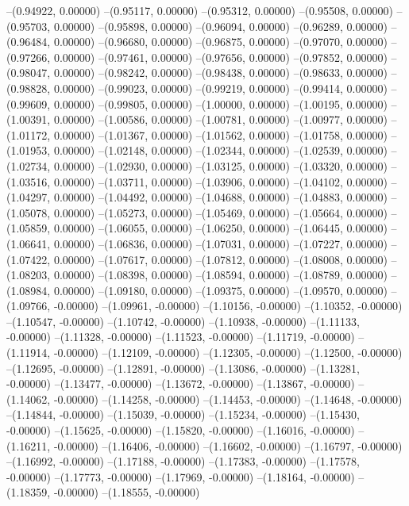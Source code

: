 --(0.94922, 0.00000)
--(0.95117, 0.00000)
--(0.95312, 0.00000)
--(0.95508, 0.00000)
--(0.95703, 0.00000)
--(0.95898, 0.00000)
--(0.96094, 0.00000)
--(0.96289, 0.00000)
--(0.96484, 0.00000)
--(0.96680, 0.00000)
--(0.96875, 0.00000)
--(0.97070, 0.00000)
--(0.97266, 0.00000)
--(0.97461, 0.00000)
--(0.97656, 0.00000)
--(0.97852, 0.00000)
--(0.98047, 0.00000)
--(0.98242, 0.00000)
--(0.98438, 0.00000)
--(0.98633, 0.00000)
--(0.98828, 0.00000)
--(0.99023, 0.00000)
--(0.99219, 0.00000)
--(0.99414, 0.00000)
--(0.99609, 0.00000)
--(0.99805, 0.00000)
--(1.00000, 0.00000)
--(1.00195, 0.00000)
--(1.00391, 0.00000)
--(1.00586, 0.00000)
--(1.00781, 0.00000)
--(1.00977, 0.00000)
--(1.01172, 0.00000)
--(1.01367, 0.00000)
--(1.01562, 0.00000)
--(1.01758, 0.00000)
--(1.01953, 0.00000)
--(1.02148, 0.00000)
--(1.02344, 0.00000)
--(1.02539, 0.00000)
--(1.02734, 0.00000)
--(1.02930, 0.00000)
--(1.03125, 0.00000)
--(1.03320, 0.00000)
--(1.03516, 0.00000)
--(1.03711, 0.00000)
--(1.03906, 0.00000)
--(1.04102, 0.00000)
--(1.04297, 0.00000)
--(1.04492, 0.00000)
--(1.04688, 0.00000)
--(1.04883, 0.00000)
--(1.05078, 0.00000)
--(1.05273, 0.00000)
--(1.05469, 0.00000)
--(1.05664, 0.00000)
--(1.05859, 0.00000)
--(1.06055, 0.00000)
--(1.06250, 0.00000)
--(1.06445, 0.00000)
--(1.06641, 0.00000)
--(1.06836, 0.00000)
--(1.07031, 0.00000)
--(1.07227, 0.00000)
--(1.07422, 0.00000)
--(1.07617, 0.00000)
--(1.07812, 0.00000)
--(1.08008, 0.00000)
--(1.08203, 0.00000)
--(1.08398, 0.00000)
--(1.08594, 0.00000)
--(1.08789, 0.00000)
--(1.08984, 0.00000)
--(1.09180, 0.00000)
--(1.09375, 0.00000)
--(1.09570, 0.00000)
--(1.09766, -0.00000)
--(1.09961, -0.00000)
--(1.10156, -0.00000)
--(1.10352, -0.00000)
--(1.10547, -0.00000)
--(1.10742, -0.00000)
--(1.10938, -0.00000)
--(1.11133, -0.00000)
--(1.11328, -0.00000)
--(1.11523, -0.00000)
--(1.11719, -0.00000)
--(1.11914, -0.00000)
--(1.12109, -0.00000)
--(1.12305, -0.00000)
--(1.12500, -0.00000)
--(1.12695, -0.00000)
--(1.12891, -0.00000)
--(1.13086, -0.00000)
--(1.13281, -0.00000)
--(1.13477, -0.00000)
--(1.13672, -0.00000)
--(1.13867, -0.00000)
--(1.14062, -0.00000)
--(1.14258, -0.00000)
--(1.14453, -0.00000)
--(1.14648, -0.00000)
--(1.14844, -0.00000)
--(1.15039, -0.00000)
--(1.15234, -0.00000)
--(1.15430, -0.00000)
--(1.15625, -0.00000)
--(1.15820, -0.00000)
--(1.16016, -0.00000)
--(1.16211, -0.00000)
--(1.16406, -0.00000)
--(1.16602, -0.00000)
--(1.16797, -0.00000)
--(1.16992, -0.00000)
--(1.17188, -0.00000)
--(1.17383, -0.00000)
--(1.17578, -0.00000)
--(1.17773, -0.00000)
--(1.17969, -0.00000)
--(1.18164, -0.00000)
--(1.18359, -0.00000)
--(1.18555, -0.00000)

